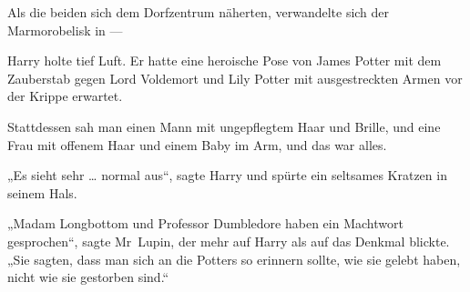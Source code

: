 Als die beiden sich dem Dorfzentrum näherten, verwandelte sich der Marmorobelisk in —

Harry holte tief Luft. Er hatte eine heroische Pose von James Potter mit dem Zauberstab gegen Lord Voldemort und Lily Potter mit ausgestreckten Armen vor der Krippe erwartet.

Stattdessen sah man einen Mann mit ungepflegtem Haar und Brille, und eine Frau mit offenem Haar und einem Baby im Arm, und das war alles.

„Es sieht sehr … normal aus“, sagte Harry und spürte ein seltsames Kratzen in seinem Hals.

„Madam Longbottom und Professor Dumbledore haben ein Machtwort gesprochen“, sagte Mr~Lupin, der mehr auf Harry als auf das Denkmal blickte.
„Sie sagten, dass man sich an die Potters so erinnern sollte, wie sie gelebt haben, nicht wie sie gestorben sind.“

